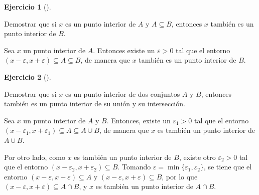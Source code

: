 \documentclass[
  spanish,
  a4paper,
]{scrreport}
\theoremstyle{definition}
\newtheorem{exercise}{Ejercicio}[chapter]
\theoremstyle{remark}
\begin{document}
\begin{exercise}[]\protect\hypertarget{exr-interior-subconjunto}{}\label{exr-interior-subconjunto}

Demostrar que si \(x\) es un punto interior de \(A\) y \(A\subseteq B\),
entonces \(x\) también es un punto interior de \(B\).

\end{exercise}

\begin{tcolorbox}[enhanced jigsaw, arc=.35mm, bottomrule=.15mm, bottomtitle=1mm, breakable, colback=white, colbacktitle=quarto-callout-tip-color!10!white, colframe=quarto-callout-tip-color-frame, coltitle=black, left=2mm, leftrule=.75mm, opacityback=0, opacitybacktitle=0.6, rightrule=.15mm, title=\textcolor{quarto-callout-tip-color}{\faLightbulb}\hspace{0.5em}{Solución}, titlerule=0mm, toprule=.15mm, toptitle=1mm]

Sea \(x\) un punto interior de \(A\). Entonces existe un
\(\varepsilon>0\) tal que el entorno
\((x-\varepsilon, x+\varepsilon)\subseteq A\subseteq B\), de manera que
\(x\) también es un punto interior de \(B\).

\end{tcolorbox}

\begin{exercise}[]\protect\hypertarget{exr-punto-interior-union-interseccion}{}\label{exr-punto-interior-union-interseccion}

Demostrar que si \(x\) es un punto interior de dos conjuntos \(A\) y
\(B\), entonces también es un punto interior de su unión y su
intersección.

\end{exercise}

\begin{tcolorbox}[enhanced jigsaw, arc=.35mm, bottomrule=.15mm, bottomtitle=1mm, breakable, colback=white, colbacktitle=quarto-callout-tip-color!10!white, colframe=quarto-callout-tip-color-frame, coltitle=black, left=2mm, leftrule=.75mm, opacityback=0, opacitybacktitle=0.6, rightrule=.15mm, title=\textcolor{quarto-callout-tip-color}{\faLightbulb}\hspace{0.5em}{Solución}, titlerule=0mm, toprule=.15mm, toptitle=1mm]

Sea \(x\) un punto interior de \(A\) y \(B\). Entonces, existe un
\(\varepsilon_1>0\) tal que el entorno
\((x-\varepsilon_1, x+\varepsilon_1)\subseteq A\subseteq A\cup B\), de
manera que \(x\) es también un punto interior de \(A\cup B\).

Por otro lado, como \(x\) es también un punto interior de \(B\), existe
otro \(\varepsilon_2>0\) tal que el entorno
\((x-\varepsilon_2, x+\varepsilon_2)\subseteq B\). Tomando
\(\varepsilon=\min\{\varepsilon_1,\varepsilon_2\}\), se tiene que el
entorno \((x-\varepsilon, x+\varepsilon)\subseteq A\) y
\((x-\varepsilon, x+\varepsilon)\subseteq B\), por lo que
\((x-\varepsilon, x+\varepsilon)\subseteq A\cap B\), y \(x\) es también
un punto interior de \(A\cap B\).

\end{tcolorbox}
\end{document}
